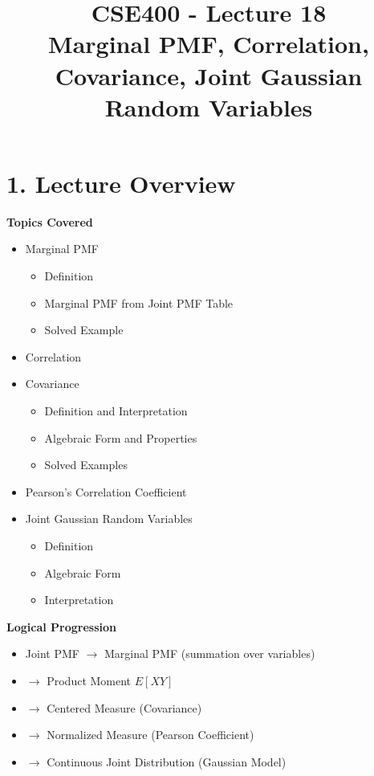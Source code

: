 \documentclass[12pt]{article}
\title{\textbf{CSE400 - Lecture 18} \\ \Large Marginal PMF, Correlation, Covariance, Joint Gaussian Random Variables}
\author{}
\date{}
\begin{document}
\maketitle

\section*{1. Lecture Overview}

\textbf{Topics Covered}
\begin{itemize}[noitemsep]
    \item Marginal PMF
    \begin{itemize}[noitemsep]
        \item Definition
        \item Marginal PMF from Joint PMF Table
        \item Solved Example
    \end{itemize}
    \item Correlation
    \item Covariance
    \begin{itemize}[noitemsep]
        \item Definition and Interpretation
        \item Algebraic Form and Properties
        \item Solved Examples
    \end{itemize}
    \item Pearson's Correlation Coefficient
    \item Joint Gaussian Random Variables
    \begin{itemize}[noitemsep]
        \item Definition
        \item Algebraic Form
        \item Interpretation
    \end{itemize}
\end{itemize}

\textbf{Logical Progression}
\begin{itemize}[noitemsep]
    \item Joint PMF $\rightarrow$ Marginal PMF (summation over variables)
    \item $\rightarrow$ Product Moment $E[XY]$
    \item $\rightarrow$ Centered Measure (Covariance)
    \item $\rightarrow$ Normalized Measure (Pearson Coefficient)
    \item $\rightarrow$ Continuous Joint Distribution (Gaussian Model)
\end{itemize}
\end{document}
